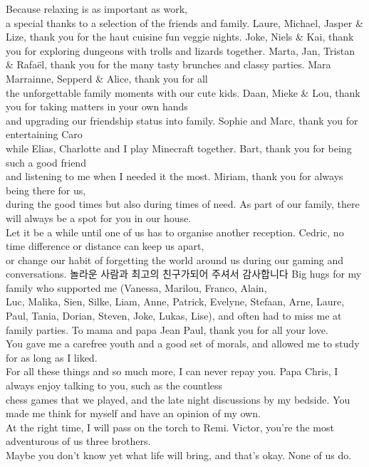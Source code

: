 Because relaxing is as important as work,\\a special thanks to a selection of the friends and family.
Laure, Michael, Jasper \& Lize, thank you for the haut cuisine fun veggie nights.
Joke, Niels \& Kai, thank you for exploring dungeons with trolls and lizards together.
Marta, Jan, Tristan \& Rafaël, thank you for the many tasty brunches and classy parties.
Mara Marrainne, Sepperd \& Alice, thank you for all\\the unforgettable family moments with our cute kids.
Daan, Mieke \& Lou, thank you for taking matters in your own hands\\and upgrading our friendship status into family.
Sophie and Marc, thank you for entertaining Caro\\while Elias, Charlotte and I play Minecraft together. 
Bart, thank you for being such a good friend\\and listening to me when I needed it the most.
Miriam, thank you for always being there for us,\\during the good times but also during times of need.
As part of our family, there will always be a spot for you in our house.\\Let it be a while until one of us has to organise another reception.
Cedric, no time difference or distance can keep us apart,\\or change our habit of forgetting the world around us during our gaming and conversations. 
놀라운 사람과 최고의 친구가되어 주셔서 감사합니다
Big hugs for my family who supported me (Vanessa, Marilou, Franco, Alain,\\Luc, Malika, Sien, Silke, Liam, Anne, Patrick, Evelyne, Stefaan, Arne, Laure, 
Paul, Tania, Dorian, Steven, Joke, Lukas, Lise), and often had to miss me at family parties.
To mama and papa Jean Paul, thank you for all your love.\\You gave me a carefree youth and a good set of morals,
and allowed me to study for as long as I liked.\\For all these things and so much more, I can never repay you.
Papa Chris, I always enjoy talking to you, such as the countless\\chess games that we played, and the late night discussions by my bedside.
You made me think for myself and have an opinion of my own.\\At the right time, I will pass on the torch to Remi.
Victor, you're the most adventurous of us three brothers.\\Maybe you don't know yet what life will bring, and that's okay. None of us do.
